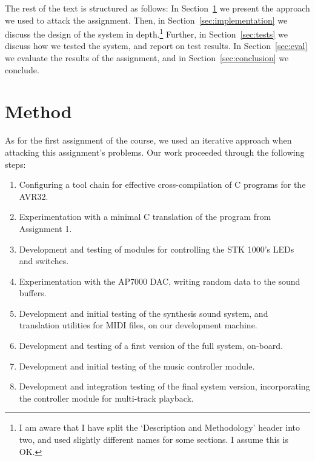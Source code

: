 \documentclass[a4paper,9pt]{article}
\begin{document}
The rest of the text is structured as follows: In Section~\ref{sec:method}
we present the approach we used to attack the assignment. Then, in
Section~\ref{sec:implementation} we discuss the design of the system in
depth.\footnote{I am aware that I have split the `Description and Methodology'
header into two, and used slightly different names for some sections. I assume
this is OK.} Further, in Section~\ref{sec:tests} we discuss how we tested the
system, and report on test results. In Section~\ref{sec:eval}
we evaluate the results of the assignment, and in
Section~\ref{sec:conclusion} we conclude.

\section{Method}
\label{sec:method}
As for the first assignment of the course, we used an iterative approach when
attacking this assignment's problems.  Our work proceeded through the
following steps:

\begin{enumerate}
  \footnotesize
  \item Configuring a tool chain for effective cross-compilation of C programs
      for the AVR32.
  \item Experimentation with a minimal C translation of the program from
      Assignment 1.
  \item Development and testing of modules for controlling the STK 1000's LEDs
      and switches.
  \item Experimentation with the AP7000 DAC, writing random data to the sound
      buffers.
  \item Development and initial testing of the synthesis sound system, and
      translation utilities for MIDI files, on our development machine.
  \item Development and testing of a first version of the full system,
      on-board.
  \item Development and initial testing of the music controller module.
  \item Development and integration testing of the final system version,
      incorporating the controller module for multi-track playback.
\end{enumerate}
\end{document}
